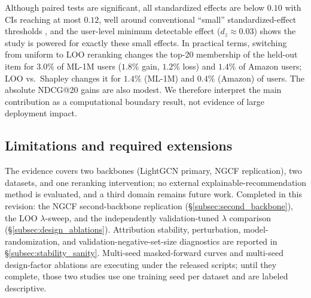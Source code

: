 \documentclass[pdflatex,sn-mathphys-num]{sn-jnl}
\begin{document}
Although paired tests are significant, all standardized effects are below $0.10$ with CIs reaching at most $0.12$, well around conventional ``small'' standardized-effect thresholds \cite{cohen1988power}, and the user-level minimum detectable effect ($d_z\approx0.03$) shows the study is powered for exactly these small effects. In practical terms, switching from uniform to LOO reranking changes the top-20 membership of the held-out item for $3.0\%$ of ML-1M users ($1.8\%$ gain, $1.2\%$ loss) and $1.4\%$ of Amazon users; LOO vs.\ Shapley changes it for $1.4\%$ (ML-1M) and $0.4\%$ (Amazon) of users. The absolute NDCG@20 gains are also modest. We therefore interpret the main contribution as a computational boundary result, not evidence of large deployment impact.

\subsection{Limitations and required extensions}\label{sec:negative_result}\label{sec:how_to_read}\label{sec:final_framing}\label{sec:future_work}\label{sec:threats}\label{sec:limitations}
The evidence covers two backbones (LightGCN primary, NGCF replication), two datasets, and one reranking intervention; no external explainable-recommendation method is evaluated, and a third domain remains future work. Completed in this revision: the NGCF second-backbone replication (\S\ref{subsec:second_backbone}), the LOO $\lambda$-sweep, and the independently validation-tuned $\lambda$ comparison (\S\ref{subsec:design_ablations}). Attribution stability, perturbation, model-randomization, and validation-negative-set-size diagnostics are reported in \S\ref{subsec:stability_sanity}. Multi-seed masked-forward curves and multi-seed design-factor ablations are executing under the released scripts; until they complete, those two studies use one training seed per dataset and are labeled descriptive.
\end{document}
